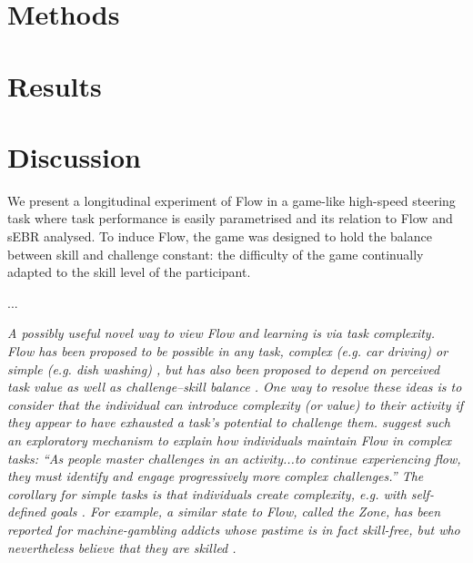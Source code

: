 \documentclass[a4paper,doc,floatsintext,natbib,10pt]{apa6}
\begin{document}
\section*{Methods}



\section*{Results}



\section*{Discussion}
We present a longitudinal experiment of Flow in a game-like high-speed steering task where task performance is easily parametrised and its relation to Flow and sEBR analysed. %
To induce Flow, the game was designed to hold the balance between skill and challenge constant: the difficulty of the game continually adapted to the skill level of the participant.

...

{\it A possibly useful novel way to view Flow and learning is via task complexity. Flow has been proposed to be possible in {\it any} task, complex (e.g. car driving) or simple (e.g. dish washing) \citep{Csikszentmihalyi1999}, but has also been proposed to depend on perceived task value as well as challenge--skill balance \citep{Keller2012}. One way to resolve these ideas is to consider that the individual can {\it introduce} complexity (or value) to their activity if they appear to have exhausted a task's potential to challenge them. \cite{Nakamura2002} suggest such an exploratory mechanism to explain how individuals maintain Flow in complex tasks: ``As people master challenges in an activity...to continue experiencing flow, they must identify and engage progressively more complex challenges.'' The corollary for simple tasks is that individuals {\it create} complexity, e.g. with self-defined goals \citep{Rauterberg1995}. For example, a similar state to Flow, called the Zone, has been reported for machine-gambling addicts whose pastime is in fact skill-free, but who nevertheless believe that they are skilled \citep{Schull2014}.}
\end{document}
